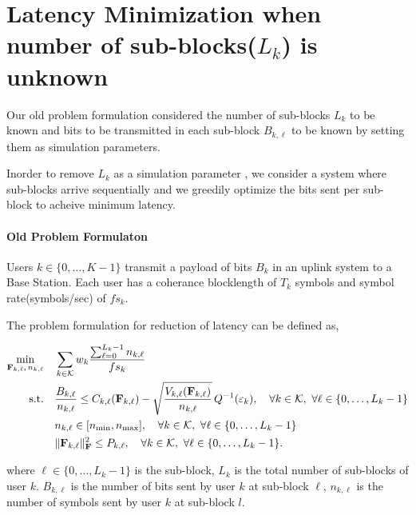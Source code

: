 \documentclass[a4paper, 12pt, onecolumn, journal, twoside, draftclsnofoot]{IEEEtran}
\begin{document}
\section{Latency Minimization when number of sub-blocks($L_k$) is unknown}

Our old problem formulation considered the number of sub-blocks $L_k$ to be known and bits to be transmitted in each sub-block $B_{k,\ell}$ to be known by setting them as simulation parameters.

Inorder to remove $L_k$ as a simulation parameter , we consider a system where sub-blocks arrive sequentially and we greedily optimize the bits sent per sub-block to acheive minimum latency. 

\paragraph*{Old Problem Formulaton}

Users $k \in \{0, \dots, K-1\}$ transmit a payload of bits $B_k$ in an uplink system to a Base Station. Each user has a coherance blocklength of $T_k$ symbols and symbol rate(symbols/sec) of $fs_k$.

The problem formulation for reduction of latency can be defined as,


\begin{equation*}
\begin{aligned}
\min_{{\bf F}_{k, \ell} ,\,n_{k,\ell}} \quad
& \sum_{k \in \mathcal{K}} w_k \frac{\sum_{\ell=0}^{L_k-1} n_{k,\ell}}{fs_k} \\
\text{s.t.}\quad
& \frac{B_{k,\ell}}{n_{k,\ell}} \le
C_{k,\ell}({\bf F}_{k, \ell} )
-\sqrt{\frac{V_{k,\ell}({\bf F}_{k, \ell} )}{n_{k,\ell}}}\,Q^{-1}(\varepsilon_k),
\quad \forall k \in \mathcal{K},\ \forall \ell \in \{0,\dots,L_k-1\} \\
& n_{k,\ell} \in [n_{\min}, n_{\max}],
\quad \forall k \in \mathcal{K},\ \forall \ell \in \{0,\dots,L_k-1\} \\
& \|{\bf F}_{k, \ell} \|_{{\bf F}}^{2} \le P_{k,\ell},
\quad \forall k \in \mathcal{K},\ \forall \ell \in \{0,\dots,L_k-1\}.
\end{aligned}
\end{equation*}


where $\ell \in \{0,\dots,L_k-1\}$ is the sub-block, $L_k$ is the total number of sub-blocks of user $k$. $B_{k,\ell}$ is the number of bits sent by user $k$ at sub-block $\ell$, $n_{k,\ell}$ is the number of symbols sent by user $k$ at sub-block $l$.


\end{document}

